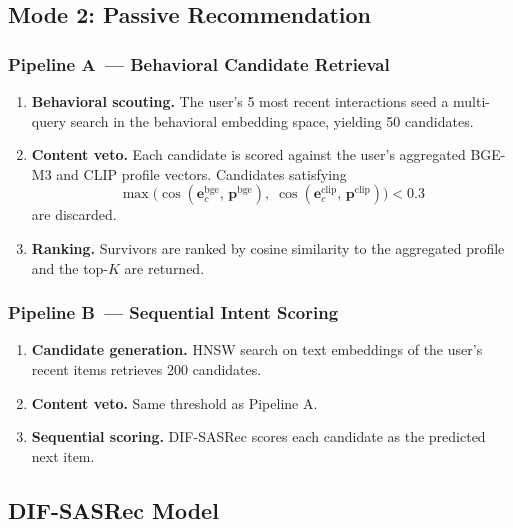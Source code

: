 
\subsection{Mode 2: Passive Recommendation}
\label{ssec:passive}

\subsubsection{Pipeline A~--- Behavioral Candidate Retrieval}
\label{sssec:pipelineA}

\begin{enumerate}
  \item \textbf{Behavioral scouting.} The user's 5 most recent interactions
        seed a multi-query search in the behavioral embedding space, yielding 50 candidates.
  \item \textbf{Content veto.} Each candidate is scored against the user's
        aggregated BGE-M3 and CLIP profile vectors.
        Candidates satisfying
        \[
          \max\!\bigl(
            \cos(\mathbf{e}^{\text{bge}}_c,\,\mathbf{p}^{\text{bge}}),\;
            \cos(\mathbf{e}^{\text{clip}}_c,\,\mathbf{p}^{\text{clip}})
          \bigr) < 0.3
        \]
        are discarded.
  \item \textbf{Ranking.} Survivors are ranked by cosine similarity to the
        aggregated profile and the top-$K$ are returned.
\end{enumerate}

\subsubsection{Pipeline B~--- Sequential Intent Scoring}
\label{sssec:pipelineB}

\begin{enumerate}
  \item \textbf{Candidate generation.} HNSW search on text embeddings of
        the user's recent items retrieves 200 candidates.
  \item \textbf{Content veto.} Same threshold as Pipeline A.
  \item \textbf{Sequential scoring.} DIF-SASRec scores each candidate as the
        predicted next item.
\end{enumerate}


\subsection{DIF-SASRec Model}
\label{ssec:difsasrec}

